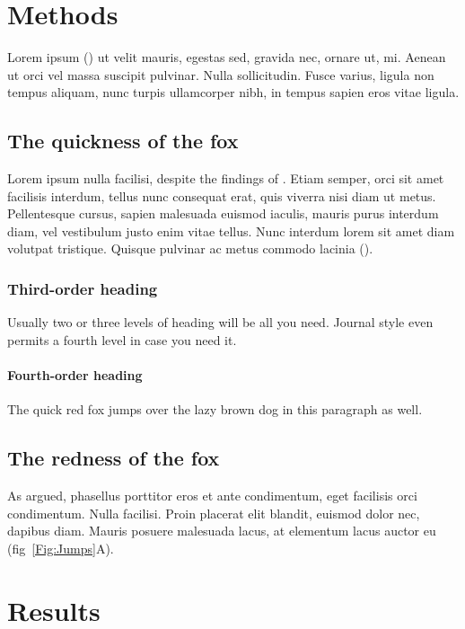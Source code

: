 \documentclass[11pt]{article}
\begin{document}
\section*{Methods}

Lorem ipsum (\citealt{Xiao2015}) ut velit mauris, egestas sed, gravida nec, ornare ut, mi. Aenean ut orci vel massa suscipit pulvinar. Nulla sollicitudin. Fusce varius, ligula non tempus aliquam, nunc turpis ullamcorper nibh, in tempus sapien eros vitae ligula.

\subsection*{The quickness of the fox}

Lorem ipsum nulla facilisi, despite the findings of \citet{LemKapEx07}. Etiam semper, orci sit amet facilisis interdum, tellus nunc consequat erat, quis viverra nisi diam ut metus. Pellentesque cursus, sapien malesuada euismod iaculis, mauris purus interdum diam, vel vestibulum justo enim vitae tellus. Nunc interdum lorem sit amet diam volutpat tristique. Quisque pulvinar ac metus commodo lacinia (\citealt{Ing11,Xiao2015}).

\subsubsection*{Third-order heading}

Usually two or three levels of heading will be all you need. Journal style even permits a fourth level in case you need it.

\paragraph*{Fourth-order heading}
The quick red fox jumps over the lazy brown dog in this paragraph as well.


\subsection*{The redness of the fox}

As \citet{Xiao2015} argued, phasellus porttitor eros et ante condimentum, eget facilisis orci condimentum. Nulla facilisi. Proin placerat elit blandit, euismod dolor nec, dapibus diam. Mauris posuere malesuada lacus, at elementum lacus auctor eu (fig~\ref{Fig:Jumps}A).

\section*{Results}
\end{document}
